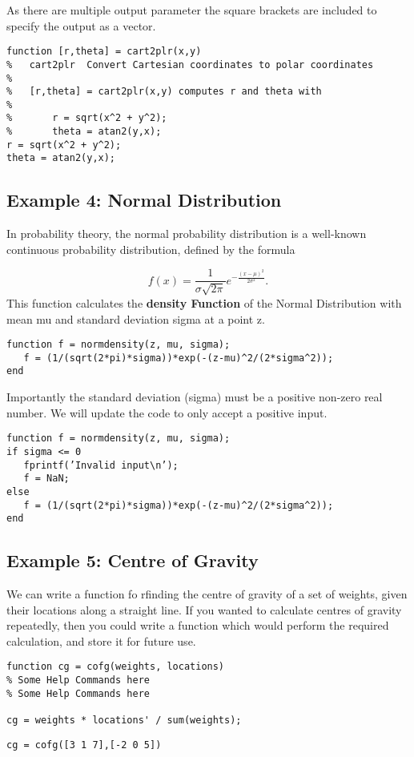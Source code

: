 \documentclass[a4paper,12pt]{article}
\begin{document}
As there are multiple output parameter the square brackets are included to specify the output as a vector.
\begin{framed}
\begin{verbatim}
function [r,theta] = cart2plr(x,y)
%   cart2plr  Convert Cartesian coordinates to polar coordinates
%
%   [r,theta] = cart2plr(x,y) computes r and theta with
%
%       r = sqrt(x^2 + y^2);
%       theta = atan2(y,x);
r = sqrt(x^2 + y^2);
theta = atan2(y,x);
\end{verbatim}
\end{framed}

\subsection{Example 4: Normal Distribution}

In probability theory, the normal probability distribution is a well-known continuous probability distribution, defined by the formula


\[f(x) = \frac{1}{\sigma\sqrt{2\pi}} e^{ -\frac{(x-\mu)^2}{2\sigma^2} }.
\]
This function calculates the \textbf{density Function} of the Normal Distribution with mean mu and standard deviation sigma at a point z.
\begin{framed}
\begin{verbatim}
function f = normdensity(z, mu, sigma);
   f = (1/(sqrt(2*pi)*sigma))*exp(-(z-mu)^2/(2*sigma^2));
end
\end{verbatim}
\end{framed}
Importantly the standard deviation (sigma) must be a positive non-zero real number. We will update the code to only accept a positive input.
\begin{framed}
\begin{verbatim}
function f = normdensity(z, mu, sigma);
if sigma <= 0
   fprintf(’Invalid input\n’);
   f = NaN;
else
   f = (1/(sqrt(2*pi)*sigma))*exp(-(z-mu)^2/(2*sigma^2));
end
\end{verbatim}
\end{framed}

\subsection{Example 5: Centre of Gravity}
We can write a function fo rfinding the centre of gravity of a set of weights, given their locations along a straight line. If you wanted to calculate centres of gravity repeatedly, then you could write a function which would perform the required calculation, and store it for future use. 
\begin{framed}
\begin{verbatim}
function cg = cofg(weights, locations)
% Some Help Commands here 
% Some Help Commands here 

cg = weights * locations' / sum(weights);
\end{verbatim}
\end{framed}
\begin{verbatim}
cg = cofg([3 1 7],[-2 0 5])
\end{verbatim}
\end{document}
